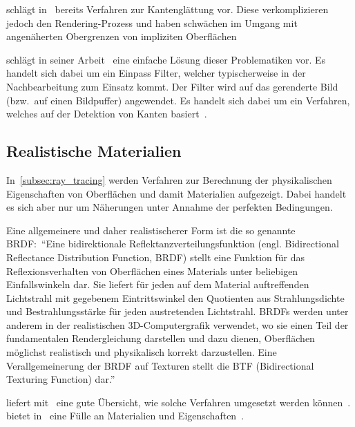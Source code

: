 \citeauthor{hart_sphere_1994} schlägt in~
bereits Verfahren zur Kantenglättung vor. Diese verkomplizieren jedoch
den Rendering-Prozess und haben schwächen im Umgang mit angenäherten
Obergrenzen von impliziten Oberflächen

\citeauthor{lottes_fxaa_2009} schlägt in seiner
Arbeit~ eine einfache Lösung dieser
Problematiken vor. Es handelt sich dabei um ein Einpass
Filter, welcher typischerweise in der Nachbearbeitung zum Einsatz kommt.
Der Filter wird auf das gerenderte Bild (bzw.\ auf einen Bildpuffer)
angewendet. Es handelt sich dabei um ein Verfahren, welches auf der
Detektion von Kanten basiert~\parencite{lottes_fxaa_2009}.

\subsection{Realistische Materialien}
\label{subsec:further_work:brdf}

In~\autoref{subsec:ray_tracing} werden Verfahren zur Berechnung der
physikalischen Eigenschaften von Oberflächen und damit Materialien
aufgezeigt. Dabei handelt es sich aber nur um Näherungen unter Annahme
der perfekten Bedingungen.

Eine allgemeinere und daher realistischerer Form ist die so genannte
BRDF:\ ``Eine bidirektionale Reflektanzverteilungsfunktion (engl.
Bidirectional Reflectance Distribution Function, BRDF) stellt eine
Funktion für das Reflexionsverhalten von Oberflächen eines Materials
unter beliebigen Einfallswinkeln dar. Sie liefert für jeden auf dem
Material auftreffenden Lichtstrahl mit gegebenem Eintrittswinkel den
Quotienten aus Strahlungsdichte und Bestrahlungsstärke für jeden
austretenden Lichtstrahl. BRDFs werden unter anderem in der
realistischen 3D-Computergrafik verwendet, wo sie einen Teil der
fundamentalen Rendergleichung darstellen und dazu dienen, Oberflächen
möglichst realistisch und physikalisch korrekt darzustellen. Eine
Verallgemeinerung der BRDF auf Texturen stellt die BTF (Bidirectional
Texturing Function)
dar.''~\parencite{wikipedia_the_free_encyclopedia_bidirektionale_2014}

\citeauthor{burley_physicall-based_2012} liefert
mit~ eine gute Übersicht,
wie solche Verfahren umgesetzt werden
können~\parencite{burley_physicall-based_2012}.
\citeauthor{bagher_accurate_2012} bietet
in~ eine Fülle an Materialien und
Eigenschaften~\parencite{bagher_accurate_2012}.

